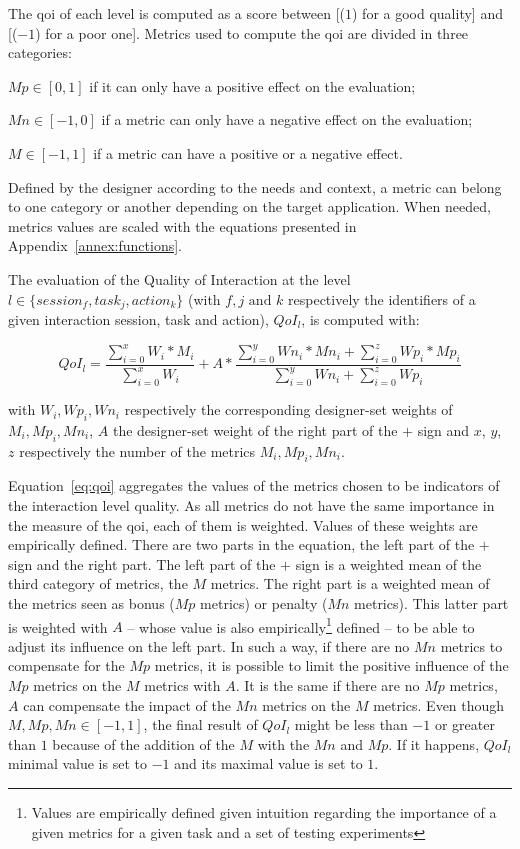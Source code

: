 \documentclass[a4paper,11pt,twoside]{StyleThese}
\begin{document}
The \acrshort{qoi} of each level is computed as a score between [($1$) for a good quality] and [($-1$) for a poor one]. Metrics used to compute the \acrshort{qoi} are divided in three categories: 
\begin{bulletList}
	\item $Mp \in [0,1]$ if it can only have a positive effect on the evaluation;
	\item $Mn \in [-1,0]$ if a metric can only have a negative effect on the evaluation;
	\item $M \in [-1,1]$ if a metric can have a positive or a negative effect.
\end{bulletList}

Defined by the designer according to the needs and context, a metric can belong to one category or another depending on the target application. When needed, metrics values are scaled with the equations presented in Appendix~\ref{annex:functions}.

The evaluation of the Quality of Interaction at the level $l \in \{session_f,task_j,action_k\}$ (with $f,j \text{ and }k$ respectively the identifiers of a given interaction session, task and action),  $QoI_l$, is computed with:

\begin{equation}\label{eq:qoi}
QoI_{l}= \frac{ \sum\limits_{i=0}^x W_i * M_i}{\sum\limits_{i=0}^x W_i} + A * \frac{ \sum\limits_{i=0}^y Wn_i * Mn_i  + \sum\limits_{i=0}^z Wp_i * Mp_i}{\sum\limits_{i=0}^y Wn_i+\sum\limits_{i=0}^z Wp_i} 
\end{equation}


with $W_i, Wp_i,Wn_i$ respectively the corresponding designer-set weights of $M_i, Mp_i, Mn_i$, $A$ the designer-set weight of the right part of the $+$ sign and $x$, $y$, $z$ respectively the number of the metrics $M_i, Mp_i, Mn_i$.

Equation~\ref{eq:qoi} aggregates the values of the metrics chosen to be indicators of the interaction level quality. As all metrics do not have the same importance in the measure of the \acrshort{qoi}, each of them is weighted. Values of these weights are empirically defined. There are two parts in the equation, the left part of the $+$ sign and the right part. The left part of the $+$ sign is a weighted mean of the third category of metrics, the $M$ metrics. The right part is a weighted mean of the metrics seen as bonus (\ie $Mp$ metrics) or penalty (\ie $Mn$ metrics). This latter part is weighted with $A$ -- whose value is also empirically\footnote{Values are empirically defined given intuition regarding the importance of a given metrics for a given task and a set of testing experiments} defined -- to be able to adjust its influence on the left part. In such a way, if there are no $Mn$ metrics to compensate for the $Mp$ metrics, it is possible to limit the positive influence of the $Mp$ metrics on the $M$ metrics with $A$. It is the same if there are no $Mp$ metrics, $A$ can compensate the impact of the $Mn$ metrics on the $M$ metrics. Even though $M, Mp, Mn \in [-1,1]$, the final result of $QoI_l$ might be less than $-1$ or greater than $1$ because of the addition of the $M$ with the $Mn$ and $Mp$. If it happens, $QoI_l$ minimal value is set to $-1$ and its maximal value is set to $1$.
\end{document}
